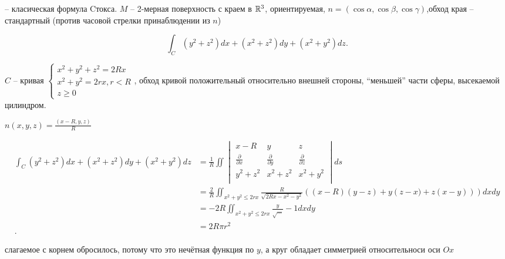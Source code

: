 \begin{note}
-- класическая формула Cтокса. $M$ -- 2-мерная поверхность с краем в $\mathbb{R}^3$, ориентируемая, $n = \left( \cos \alpha, \cos\beta, \cos \gamma \right) $,обход края -- стандартный (против часовой стрелки принаблюдении из $n$)
\end{note}

\begin{example}
     \[
         \int_C \left( y^2+z^2 \right) dx + \left( x^2+z^2 \right) dy + \left( x^2+y^2 \right) dz
     .\] 

     $C$ -- кривая  $\begin{cases}
         x^2+y^2+z^2 = 2Rx\\
         x^2+y^2=2rx,r<R\\
         z\geqslant 0
     \end{cases}$, обход кривой положительный относительно внешней стороны, ``меньшей'' части сферы, высекаемой цилиндром.

     $n(x,y,z) = \frac{(x-R,y,z)}{R}$

     \begin{align*}
         \int_C \left( y^2+z^2 \right) dx + \left( x^2+z^2 \right) dy + \left( x^2+y^2 \right) dz &= \frac{1}{R}\iint 
         \begin{vmatrix}
             x-R&y&z\\
             \frac{\partial }{\partial x}&\frac{\partial }{\partial y}&\frac{\partial }{\partial z}\\
             y^2+z^2&x^2+z^2&x^2+y^2\\
         \end{vmatrix}ds\\
                                                                                                  &= \frac{2}{R} \iint_{x^2+y^2\leqslant 2rx} \frac{R}{\sqrt{2Rx-x^2-y^2} } \left( \left( x-R \right) \left( y-z \right) +y\left( z-x) + z(x-y) \right)  \right) dxdy\\
                                                                                                  &= -2R \iint_{x^2+y^2\leqslant 2rx} \frac{y}{\sqrt{\ldots} } - 1dxdy \\
                                                                                                  &= 2R \pi r^2 \\
    .\end{align*}

    слагаемое с корнем обросилось, потому что это нечётная функция по $y$, а круг обладает симметрией относительноси оси $Ox$
\end{example}

